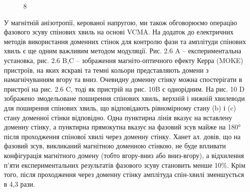 \documentclass[a4paper,14pt]{extreport}
\begin{document}
\begin{figure}[h]
   \caption{8}
 \end{figure}

  У магнітній анізотропії, керованої напругою, ми також обговорюємо операцію фазового зсуву спінових хвиль на основі VCMA. На додаток до електричних методів використання доменних стінок для контролю фази та амплітуди спінових хвиль є ще одним важливим методом модуляції. Рис. 2.6 A – експериментальна установка, рис. 2.6 B,C – зображення магніто-оптичного ефекту Керра (MOKE) пристроїв, на яких яскраві та темні кольори представляють домени з намагнічуванням вгору та вниз. Очевидну доменну стінку можна спостерігати в пристрої на рис. 2.6 C, тоді як пристрій на рис. 10B є однорідним. На рис. 10 D зображено змодельоване поширення спінових хвиль, верхній і нижній хвилеводи для поширення спінових хвиль, що відповідають рівномірному стану (b) і (c) стану доменної стінки відповідно. Одна пунктирна лінія вказує на вставлену доменну стінку, а пунктирна прямокутна вказує на фазовий зсув майже на 180° після проходження спінової хвилі через доменну стінку. Ханет ал. довів, що на фазовий зсув, викликаний магнітною доменною стінкою, не буде впливати конфігурація магнітного домену (тобто вгору-вниз або вниз-вгору), а відхилення п'яти експериментальних результатів фазового зсуву становить менше 10\%. Крім того, після проходження через доменну стінку амплітуда спін-хвилі зменшується в 4,3 рази.\\
\end{document}
